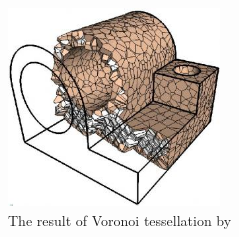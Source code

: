 \begin{figure}
        \centering
        \includegraphics[width=0.5\textwidth]{img/clippedresult}
        \caption{The result of Voronoi tessellation by \citet{yan2010efficient}}
        \label{fig:voro}
\end{figure}

